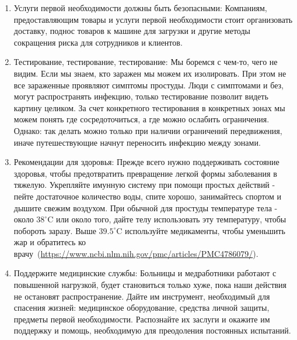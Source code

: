 \documentclass[onecolumn,journal]{IEEEtran}
\begin{document}
\begin{multicols}{2}
\begin{enumerate}
\item Услуги первой необходимости должны быть безопасными: Компаниям, предоставляющим товары и услуги первой необходимости стоит организовать доставку, поднос товаров к машине для загрузки и другие методы сокращения риска для сотрудников и клиентов.
\item Тестирование, тестирование, тестирование: Мы боремся с чем-то, чего не видим. Если мы знаем, кто заражен мы можем их изолировать. При этом не все зараженные проявляют симптомы простуды. Люди с симптомами и без, могут распространять инфекцию, только тестирование позволит видеть картину целиком. За счет конкретного тестирования в конкретных зонах мы можем понять где сосредоточиться, а где можно ослабить ограничения. Однако: так делать можно только при наличии ограничений передвижения, иначе путешествующие начнут переносить инфекцию между зонами.
\item Рекомендации для здоровья: Прежде всего нужно поддерживать состояние здоровья, чтобы предотвратить превращение легкой формы заболевания в тяжелую. Укрепляйте имунную систему при помощи простых действий - пейте достаточное количество воды, спите хорошо, занимайтесь спортом и дышите свежим воздухом. При обычной для простуды температуре тела - около $38^\circ$C или около того, дайте телу использовать эту температуру, чтобы побороть заразу. Выше $39.5^\circ$C используйте медикаменты, чтобы уменьшить жар и обратитесь ко врачу~(\url{https://www.ncbi.nlm.nih.gov/pmc/articles/PMC4786079/}).
\item Поддержите медицинские службы: Больницы и медработники работают с повышенной нагрузкой, будет становиться только хуже, пока наши действия не остановят распространение. Дайте им инструмент, необходимый для спасения жизней: медицинское оборудование, средства личной защиты, предметы первой необходимости. Распознайте их заслуги и окажите им поддержку и помощь, необходимую для преодоления постоянных испытаний.
\end{enumerate}

\end{multicols}




% 
\end{document}
